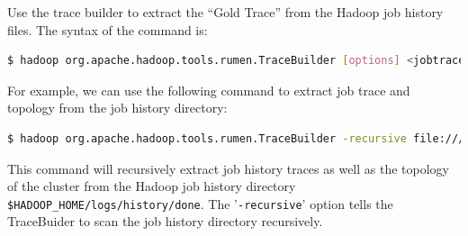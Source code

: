 Use the trace builder to extract the ``Gold Trace'' from the Hadoop job history files. The syntax of the command is:
\lstset{style=bashstyle}
\begin{lstlisting}[language=bash]
$ hadoop org.apache.hadoop.tools.rumen.TraceBuilder [options] <jobtrace-output> <topology-output> <inputs>
\end{lstlisting}

For example, we can use the following command to extract job trace and topology from the job history directory:
\lstset{style=bashstyle}
\begin{lstlisting}[language=bash]$ hadoop org.apache.hadoop.tools.rumen.TraceBuilder -recursive file:///tmp/jobtraces.json file:///tmp/topology.out file:///usr/local/hadoop/logs/history/done
\end{lstlisting}

This command will recursively extract job history traces as well as the topology of the cluster from the Hadoop job history directory \verb|$HADOOP_HOME/logs/history/done|. The '\verb|-recursive|' option tells the TraceBuider to scan the job history directory recursively.

